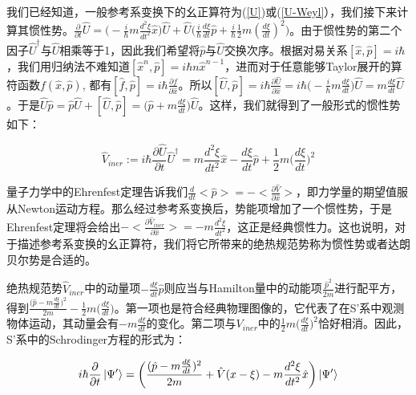 \documentclass[a4paper]{article}
\begin{document}
        我们已经知道，一般参考系变换下的幺正算符为(\ref{U})或(\ref{U-Weyl}），我们接下来计算其惯性势。$\frac{\partial}{\partial t}\hat{U} = \big(-\frac{i}{\hbar}m\frac{d^2 \xi}{dt^2} \hat{x}\big)\hat{U} + \hat{U}\big(\frac{i}{\hbar}\frac{d\xi}{dt}\hat{p} + \frac{i}{\hbar}\frac{1}{2}m(\frac{d\xi}{dt})^2\big)$。由于惯性势的第二个因子$\hat{U}^\dagger$与$\hat{U}$相乘等于1，因此我们希望将$\hat{p}$与$\hat{U}$交换次序。根据对易关系$[\hat{x},\hat{p}]=i\hbar$，我们用归纳法不难知道$[\hat{x}^n,\hat{p}]=i\hbar n\hat{x}^{n-1}$，进而对于任意能够Taylor展开的算符函数$f(\hat{x},\hat{p})$, 都有$[\hat{f}, \hat{p}]=i\hbar\frac{\partial f}{\partial\hat{x}}$。所以$[\hat{U}, \hat{p}] = i\hbar\frac{\partial\hat{U}}{\partial\hat{x}} = i\hbar\big(-\frac{i}{\hbar}m\frac{d\xi}{dt}\big)\hat{U} = m\frac{d\xi}{dt}\hat{U}$。于是$\hat{U}\hat{p} = \hat{p}\hat{U} + [\hat{U}, \hat{p}] = \big(\hat{p}+m\frac{d\xi}{dt}\big)\hat{U}$。这样，我们就得到了一般形式的惯性势如下：

        \begin{equation}
            \hat{V}_{iner} := i\hbar\frac{\partial\hat{U}}{\partial t}\hat{U}^\dagger = m \frac{d^2\xi}{d t^2}\hat{x}-\frac{d\xi}{dt}\hat{p}+\frac{1}{2}m\bigg(\frac{d\xi}{dt}\bigg)^2
        \end{equation}

        量子力学中的Ehrenfest定理告诉我们$\frac{d}{dt}<\hat{p}>=-<\frac{\partial\hat{V}}{\partial \hat{x}}>$，即力学量的期望值服从Newton运动方程。那么经过参考系变换后，势能项增加了一个惯性势，于是Ehrenfest定理将会给出$-<\frac{\partial\hat{V}_{iner}}{\partial \hat{x}}>=-m \frac{d^2\xi}{d t^2}$，这正是经典惯性力。这也说明，对于描述参考系变换的幺正算符，我们将它所带来的绝热规范势称为惯性势或者达朗贝尔势是合适的。

        绝热规范势$\hat{V}_{iner}$中的动量项$-\frac{d\xi}{dt}\hat{p}$则应当与Hamilton量中的动能项$\frac{\hat{p}^2}{2m}$进行配平方，得到$\frac{\big(\hat{p}-m\frac{d\xi}{dt}\big)^2}{2m}-\frac{1}{2}m\big(\frac{d\xi}{dt}\big)$。第一项也是符合经典物理图像的，它代表了在S'系中观测物体运动，其动量会有$-m\frac{d\xi}{dt}$的变化。第二项与$V_{iner}$中的$\frac{1}{2}m\big(\frac{d\xi}{dt}\big)^2$恰好相消。因此，S'系中的Schrodinger方程的形式为：

        \begin{equation}
            i\hbar\frac{\partial}{\partial t}\ket{\Psi'} = \biggl(\frac{(\hat{p}-m\frac{d\xi}{dt})^2}{2m}+\hat{V}(x-\xi)-m\frac{d^2\xi}{dt^2}\hat{x}\biggr) \ket{\Psi'}
        \end{equation}
        
\end{document}
